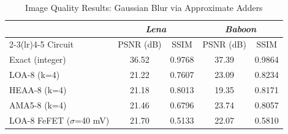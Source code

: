 \begin{table}[t]
\centering
\caption{Image Quality Results: Gaussian Blur via Approximate Adders}
\label{tab:image_quality}
\begin{tabular}{lcccc}
\toprule
& \multicolumn{2}{c}{\textit{Lena}} & \multicolumn{2}{c}{\textit{Baboon}} \\
\cmidrule(lr){2-3}\cmidrule(lr){4-5}
Circuit & PSNR (dB) & SSIM & PSNR (dB) & SSIM \\
\midrule
Exact (integer) & 36.52 & 0.9768 & 37.39 & 0.9864 \\
LOA-8 (k=4) & 21.22 & 0.7607 & 23.09 & 0.8234 \\
HEAA-8 (k=4) & 21.18 & 0.8013 & 19.35 & 0.8171 \\
AMA5-8 (k=4) & 21.46 & 0.6796 & 23.74 & 0.8057 \\
LOA-8 FeFET ($\sigma$=40 mV) & 21.70 & 0.5133 & 22.07 & 0.5810 \\
\bottomrule
\end{tabular}
\end{table}
